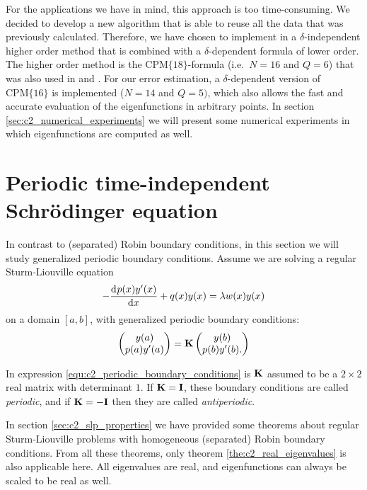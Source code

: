 For the applications we have in mind, this approach is too time-consuming. We decided to develop a new algorithm that is able to reuse all the data that was previously calculated. Therefore, we have chosen to implement in  a $\delta$-independent higher order method that is combined with a $\delta$-dependent formula of lower order. The higher order method is the $\text{CPM}\{18\}$-formula (i.e.\ $N=16$ and $Q=6$) that was also used in \matslise{} and . For our error estimation, a $\delta$-dependent version of $\text{CPM}\{16\}$ is implemented ($N=14$ and $Q=5)$, which also allows the fast and accurate evaluation of the eigenfunctions in arbitrary points. In section \ref{sec:c2_numerical_experiments} we will present some numerical experiments in which eigenfunctions are computed as well.

\section{Periodic \texorpdfstring{\oneD}{1D} time-independent Schrödinger equation}\label{sec:c2_periodic}

In contrast to (separated) Robin boundary conditions, in this section we will study generalized periodic boundary conditions. Assume we are solving a regular Sturm-Liouville equation
\begin{equation}\label{equ:c2_periodic_sturm_liouville}
    -\dv[]{p(x)y'(x)}{x} + q(x)y(x) = \lambda w(x) y(x)
\end{equation}
on a domain $[a, b]$, with generalized periodic boundary conditions:
\begin{equation}\label{equ:c2_periodic_boundary_conditions}
    \begin{pmatrix}
        y(a) \\ p(a)y'(a)
    \end{pmatrix} = \vb{K}\begin{pmatrix}
        y(b) \\ p(b)y'(b)\text{.}
    \end{pmatrix}
\end{equation}

In expression \eqref{equ:c2_periodic_boundary_conditions} is $\vb{K}$ assumed to be a $2 \times 2$ real matrix with determinant $1$\cite{binding_prufer_2013}. If $\vb{K} = \vb{I}$, these boundary conditions are called \emph{periodic}, and if $\vb{K} = -\vb{I}$ then they are called \emph{antiperiodic}.

In section \ref{sec:c2_slp_properties} we have provided some theorems about regular Sturm-Liouville problems with homogeneous (separated) Robin boundary conditions. From all these theorems, only theorem \ref{the:c2_real_eigenvalues} is also applicable here. All eigenvalues are real, and eigenfunctions can always be scaled to be real as well.

